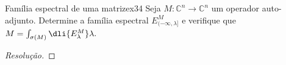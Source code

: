 \begin{exercício}{Família espectral de uma matriz}{ex34}
  Seja \(M : \mathbb{C}^n \to \mathbb{C}^n\) um operador auto-adjunto. Determine a família espectral \(E^M_{(-\infty, \lambda]}\) e verifique que \(M = \int_{\sigma(M)} \dli{E_\lambda^M}\lambda.\)
\end{exercício}
\begin{proof}[Resolução]

\end{proof}
